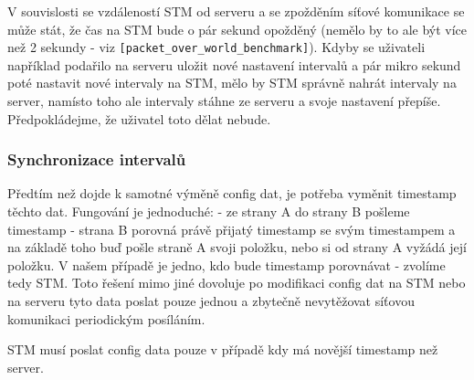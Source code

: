V souvislosti se vzdáleností STM od serveru a se zpožděním síťové komunikace se může
stát, že čas na STM bude o pár sekund opožděný (nemělo by to ale být více než 2 sekundy -
viz \texttt{[packet\_over\_world\_benchmark]}).
Kdyby se uživateli například podařilo na serveru uložit nové nastavení intervalů
a pár mikro sekund poté nastavit nové intervaly na STM, mělo by STM správně nahrát
intervaly na server, namísto toho ale intervaly stáhne ze serveru a svoje nastavení přepíše.
Předpokládejme, že uživatel toto dělat nebude.

\subsubsection{Synchronizace intervalů}

Předtím než dojde k samotné výměně config dat, je potřeba vyměnit timestamp těchto dat.
Fungování je jednoduché:
- ze strany A do strany B pošleme timestamp
- strana B porovná právě přijatý timestamp se svým timestampem a na základě toho buď pošle
    straně A svoji položku, nebo si od strany A vyžádá její položku.
V našem případě je jedno, kdo bude timestamp porovnávat - zvolíme tedy STM.
Toto řešení mimo jiné dovoluje po modifikaci config dat na STM nebo na serveru
tyto data poslat pouze jednou a zbytečně nevytěžovat síťovou komunikaci periodickým
posíláním.

STM musí poslat config data pouze v případě kdy má novější timestamp než server.




